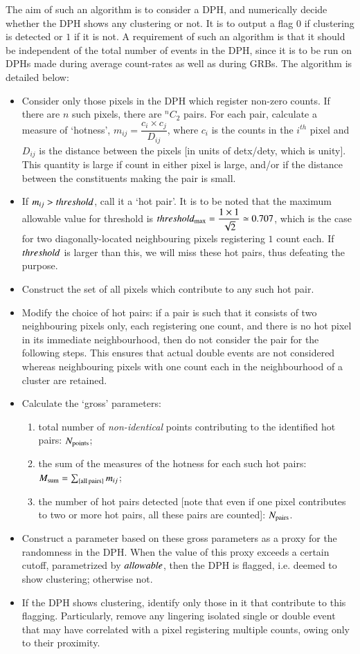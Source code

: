 The aim of such an algorithm is to consider a DPH, and numerically decide whether the DPH shows any clustering or not. It is to output a flag $0$ if clustering is detected or $1$ if it is not. A requirement of such an algorithm is that it should be independent of the total number of events in the DPH, since it is to be run on DPHs made during average count-rates as well as during GRBs. The algorithm is detailed below:
\begin{itemize}
\item Consider only those pixels in the DPH which register non-zero counts. If there are $n$ such pixels, there are $^{n}C_{2}$ pairs. For each pair, calculate a measure of `hotness', $m{}_{ij} = \dfrac{c_i \times c_j}{D_{ij}}$, where $c_{i}$ is the counts in the $i^{th}$ pixel and $D_{ij}$ is the distance between the pixels [in units of detx/dety, which is unity]. This quantity is large if count in either pixel is large, and/or if the distance between the constituents making the pair is small.
\item If $m_{ij} > threshold$, call it a `hot pair'. It is to be noted that the maximum allowable value for threshold is  $threshold_{\rm{max}} = \dfrac{1 \times 1}{\sqrt{2}} \simeq 0.707$, which is the case for two diagonally-located neighbouring pixels registering $1$ count each. If $threshold$ is larger than this, we will miss these hot pairs, thus defeating the purpose.
\item Construct the set of all pixels which contribute to any such hot pair.
\item Modify the choice of hot pairs: if a pair is such that it consists of two neighbouring pixels only, each registering one count, and there is no hot pixel in its immediate neighbourhood, then do not consider the pair for the following steps. This ensures that actual double events are not considered whereas neighbouring pixels with one count each in the neighbourhood of a cluster are retained.
\item Calculate the `gross' parameters: 
\begin{enumerate}
\item total number of \emph{non-identical} points contributing to the identified hot pairs: $N_{\rm{points}}$;
\item the sum of the measures of the hotness for each such hot pairs:  $M_{\rm{sum}} = \sum_{\{\rm{all \, pairs}\}}m_{ij}$;
\item the number of hot pairs detected [note that even if one pixel contributes to two or more hot pairs, all these pairs are counted]: $N_{\rm{pairs}}$.
\end{enumerate}
\item Construct a parameter based on these gross parameters as a proxy for the randomness in the DPH. When the value of this proxy exceeds a certain cutoff, parametrized by $allowable$, then the DPH is flagged, i.e. deemed to show clustering; otherwise not.
\item If the DPH shows clustering, identify only those in it that contribute to this flagging. Particularly, remove any lingering isolated single or double event that may have correlated with a pixel registering multiple counts, owing only to their proximity.
\end{itemize}




